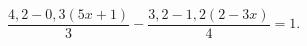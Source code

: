 \begin{ex}[type=equation]
	\begin{condition}
		$\dfrac{4,2 - 0,3(5x+1)}{3} - \dfrac{3,2 - 1,2(2-3x)}{4} = 1.$
	\end{condition}
\end{ex}